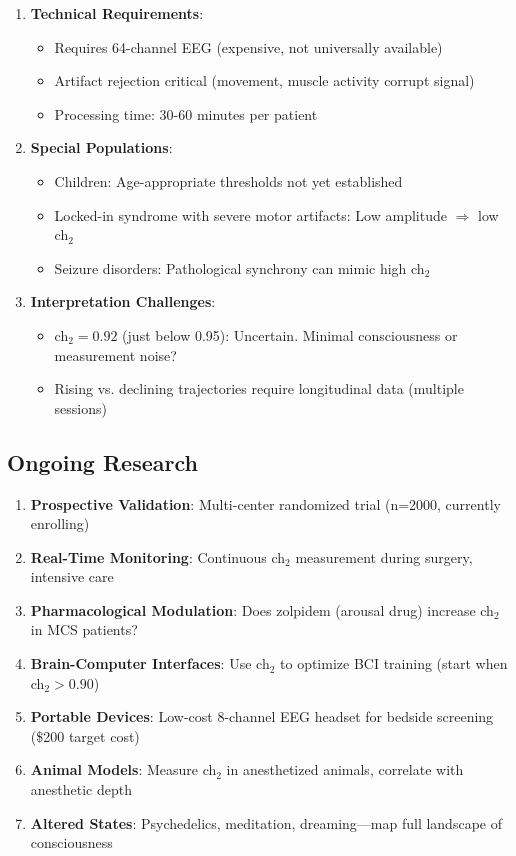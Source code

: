 \begin{enumerate}
\item \textbf{Technical Requirements}:
\begin{itemize}
\item Requires 64-channel EEG (expensive, not universally available)
\item Artifact rejection critical (movement, muscle activity corrupt signal)
\item Processing time: 30-60 minutes per patient
\end{itemize}

\item \textbf{Special Populations}:
\begin{itemize}
\item Children: Age-appropriate thresholds not yet established
\item Locked-in syndrome with severe motor artifacts: Low amplitude $\Rightarrow$ low ch$_2$
\item Seizure disorders: Pathological synchrony can mimic high ch$_2$
\end{itemize}

\item \textbf{Interpretation Challenges}:
\begin{itemize}
\item ch$_2 = 0.92$ (just below 0.95): Uncertain. Minimal consciousness or measurement noise?
\item Rising vs. declining trajectories require longitudinal data (multiple sessions)
\end{itemize}
\end{enumerate}

\subsection{Ongoing Research}

\begin{enumerate}
\item \textbf{Prospective Validation}: Multi-center randomized trial (n=2000, currently enrolling)

\item \textbf{Real-Time Monitoring}: Continuous ch$_2$ measurement during surgery, intensive care

\item \textbf{Pharmacological Modulation}: Does zolpidem (arousal drug) increase ch$_2$ in MCS patients?

\item \textbf{Brain-Computer Interfaces}: Use ch$_2$ to optimize BCI training (start when ch$_2 > 0.90$)

\item \textbf{Portable Devices}: Low-cost 8-channel EEG headset for bedside screening (\$200 target cost)

\item \textbf{Animal Models}: Measure ch$_2$ in anesthetized animals, correlate with anesthetic depth

\item \textbf{Altered States}: Psychedelics, meditation, dreaming—map full landscape of consciousness
\end{enumerate}

